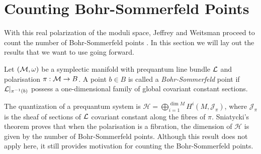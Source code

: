	
	\section{Counting Bohr-Sommerfeld Points}
	With this real polarization of the moduli space, Jeffrey and Weitsman proceed to count the number of Bohr-Sommerfeld points \cite{jeffrey_bohr-sommerfeld_1992}. In this section we will lay out the results that we want to use going forward.
	
	\begin{definition}
		Let $(\mathcal{M},\omega)$ be a symplectic manifold with prequantum line bundle $\mathcal{L}$ and polarisation $\pi:\mathcal{M}\to B$. A point $b\in B$ is called a \emph{Bohr-Sommerfeld} point if $\mathcal{L}|_{\pi^{-1}(b)}$ possess a one-dimensional family of global covariant constant sections.
	\end{definition}
	The quantization of a prequantum system is $\mathcal{H} = \bigoplus_{i=1}^{\dim M} H^i(M, \mathcal{J}_\pi)$, where $\mathcal{J}_\pi$ is the sheaf of sections of $\mathcal{L}$ covariant constant along the fibres of $\pi$. Sniatycki's theorem \cite{sniatycki_cohomology_1977} proves that when the polarisation is a fibration, the dimension of $\mathcal{H}$ is given by the number of Bohr-Sommerfeld points. Although this result does not apply here, it still provides motivation for counting the Bohr-Sommerfeld points.
	
